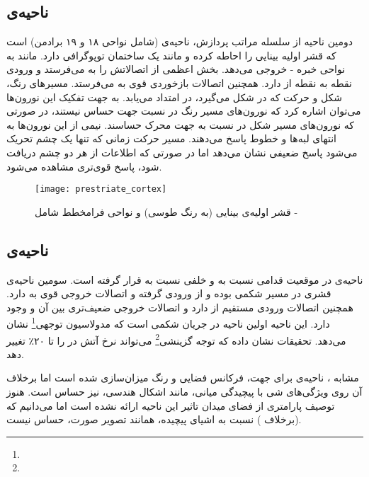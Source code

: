 \subsection{ناحیه‌ی }
دومین ناحیه از سلسله مراتب پردازش، ناحیه‌ی  (شامل نواحی ۱۸ و ۱۹ برادمن) است که قشر اولیه بینایی را احاطه کرده و مانند  یک ساختمان توپوگرافی دارد.  مانند  به نواحی خبره - خروجی می‌دهد.  بخش اعظمی از اتصالاتش را به  می‌فرستد و  ورودی نقطه به نقطه از  دارد.  همچنین اتصالات بازخوردی قوی به  می‌فرستد. مسیر‌های رنگ، شکل و حرکت که در  شکل می‌گیرد، در  امتداد می‌یابد. به جهت تفکیک این نورون‌ها می‌توان اشاره کرد که نورون‌های مسیر رنگ در  نسبت جهت حساس نیستند، در صورتی که نورون‌های مسیر شکل در  نسبت به جهت محرک حساسند. نیمی از این نورون‌ها به انتهای لبه‌ها و خطوط پاسخ می‌دهند. مسیر حرکت زمانی که تنها یک چشم تحریک می‌شود پاسخ ضعیفی نشان می‌دهد اما در صورتی که اطلاعات از هر دو چشم دریافت شود، پاسخ قوی‌تری مشاهده می‌شود. 

\begin{figure}
\centering
{\footnotesize
\texttt{[image: prestriate\_cortex]}
\caption[قشر اولیه‌ی بینایی (به رنگ طوسی) و نواحی فرامخطط شامل -]{قشر اولیه‌ی بینایی (به رنگ طوسی) و نواحی فرامخطط شامل -\cite{zeki1993vision}}
\label{fig:prestriate_cortex}
}
\end{figure}

\subsection{ناحیه‌ی }
ناحیه‌ی  در موقعیت قدامی نسبت به  و خلفی نسبت به  قرار گرفته است.  سومین ناحیه‌ی قشری در مسیر شکمی بوده و از  ورودی گرفته و اتصالات خروجی قوی به  دارد. همچنین اتصالات ورودی مستقیم از  دارد و اتصالات خروجی ضعیف‌تری بین آن و  وجود دارد. این ناحیه اولین ناحیه در جریان شکمی است که مدولاسیون توجهی\footnote{} نشان می‌دهد. تحقیقات نشان داده که توجه گزینشی\footnote{} می‌تواند نرخ آتش در  را تا ۲۰٪ تغییر دهد. 

مشابه ، ناحیه‌ی  برای جهت، فرکانس فضایی و رنگ میزان‌سازی شده است اما برخلاف آن روی ویژگی‌های شی با پیچیدگی میانی، مانند اشکال هندسی، نیز حساس است. هنوز توصیف پارامتری از فضای میدان تاثیر این ناحیه ارائه نشده است اما می‌دانیم که  (برخلاف ) نسبت به اشیای پیچیده، همانند تصویر صورت، حساس نیست. 

